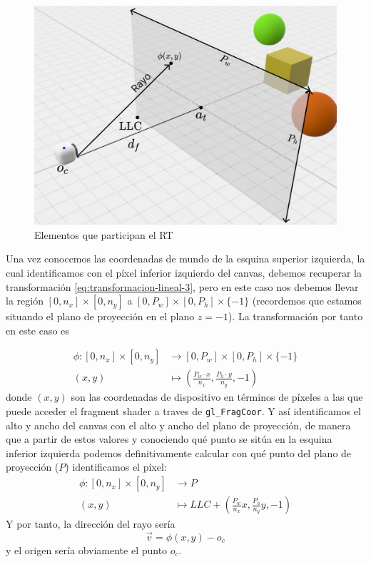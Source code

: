 \begin{figure} [ht]
    \centering
    \includegraphics[scale = 0.25]{img/C7/elementos-PP.png}
    \caption{Elementos que participan el RT}
    \label{fig:elementos}
\end{figure}

Una vez conocemos las coordenadas de mundo de la esquina superior izquierda, la cual identificamos con el píxel inferior izquierdo del canvas, debemos recuperar la transformación \ref{eq:transformacion-lineal-3}, pero en este caso nos debemos llevar la región $[0,n_x]\times[0,n_y]$ a $[0,P_w]\times[0,P_h]\times\{-1\}$ (recordemos que estamos situando el plano de proyección en el plano $z=-1$). La transformación por tanto en este caso es

\begin{equation}
    \label{eq:transformacion-lineal-4}
    \begin{split}
        \phi : [0,n_x]\times [0,n_y] & \longrightarrow [0,P_w]\times[0,P_h]\times \{-1\} \\
        (x,y) & \longmapsto \left(\frac{P_w\cdot x}{n_x},\frac{P_h\cdot y}{n_y},-1\right)
    \end{split}
\end{equation}
donde $(x,y)$ son las coordenadas de dispositivo en términos de píxeles a las que puede acceder el fragment shader a traves de \verb|gl_FragCoor|. Y así identificamos el alto y ancho del canvas con el alto y ancho del plano de proyección, de manera que a partir de estos valores y conociendo qué punto se sitúa en la esquina inferior izquierda podemos definitivamente calcular con qué punto del plano de proyección ($P$) identificamos el píxel:
\begin{equation}
    \label{eq:transformacion-lineal-5}
    \begin{split}
        \phi : [0,n_x]\times [0,n_y] & \longrightarrow P \\
        (x,y) & \longmapsto LLC + \left(\frac{P_w}{n_x}x,\frac{P_h}{n_y}y,-1\right)
    \end{split}
\end{equation}
Y por tanto, la dirección del rayo sería
$$
\vec v = \phi(x,y) - o_c
$$
y el origen sería obviamente el punto $o_c$.

